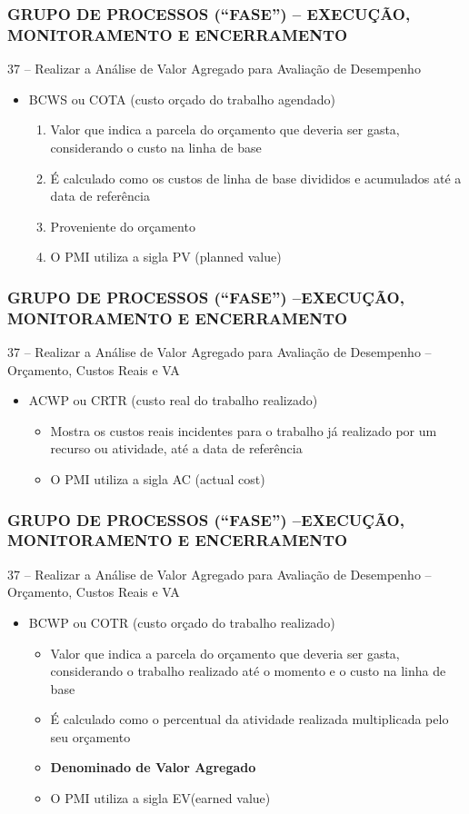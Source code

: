  \begin{frame}
 \frametitle{GRUPO DE PROCESSOS (“FASE”) – \small{EXECUÇÃO, MONITORAMENTO E ENCERRAMENTO}}
 37 – Realizar a Análise de Valor Agregado para Avaliação de Desempenho
 
\begin{itemize}
 \item BCWS ou COTA (custo orçado do trabalho agendado)
  \begin{enumerate}
   \item Valor que indica a parcela do orçamento que deveria ser gasta, considerando o custo na linha de base
   \item É calculado como os custos de linha de base divididos e acumulados até a data de referência
   \item Proveniente do orçamento
   \item O PMI utiliza a sigla PV (planned value)
  \end{enumerate}
 \end{itemize}
 \end{frame}
 
\begin{frame}
 \frametitle{GRUPO DE PROCESSOS (“FASE”) –\small{EXECUÇÃO, MONITORAMENTO E ENCERRAMENTO}}
37 – Realizar a Análise de Valor Agregado para Avaliação de Desempenho – Orçamento, Custos Reais e VA
\begin{itemize}
 \item ACWP ou CRTR (custo real do trabalho realizado)
 \begin{itemize}
  \item Mostra os custos reais incidentes para o trabalho já realizado por um recurso ou atividade, até a data de referência
  \item O PMI utiliza a sigla AC (actual cost)
 \end{itemize}
 \end{itemize}
\end{frame}

\begin{frame}
 \frametitle{GRUPO DE PROCESSOS (“FASE”) –\small{EXECUÇÃO, MONITORAMENTO E ENCERRAMENTO}}
37 – Realizar a Análise de Valor Agregado para Avaliação de Desempenho – Orçamento, Custos Reais e VA
\begin{itemize}
 \item BCWP ou COTR (custo orçado do trabalho realizado)
 \begin{itemize}
  \item Valor que indica a parcela do orçamento que deveria ser gasta, considerando o trabalho realizado até o momento e o custo na linha de base
   \item É calculado como o percentual da atividade realizada multiplicada pelo seu orçamento
    \item \textbf{Denominado de Valor Agregado}
    \item O PMI utiliza a sigla EV(earned value)
 \end{itemize}
 \end{itemize}
\end{frame}

